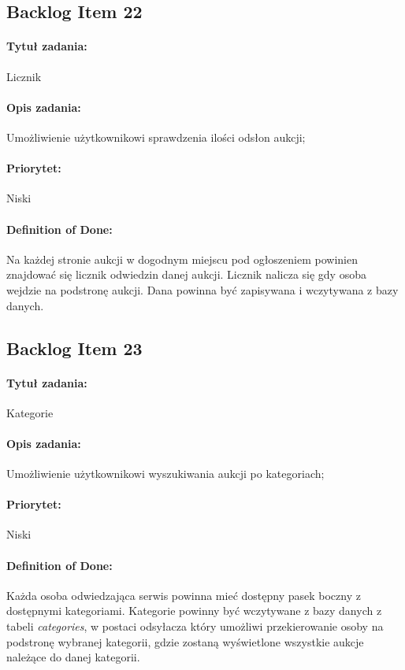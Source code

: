\documentclass[a4paper]{article}
\begin{document}
	\subsection{Backlog Item 22}
	\paragraph{Tytuł zadania:} Licznik
	\paragraph{Opis zadania:} Umożliwienie użytkownikowi sprawdzenia ilości odsłon aukcji;
	\paragraph{Priorytet:} Niski
	\paragraph{Definition of Done:} Na każdej stronie aukcji w dogodnym miejscu pod ogłoszeniem powinien znajdować się licznik odwiedzin danej aukcji. Licznik nalicza się gdy osoba wejdzie na podstronę aukcji. Dana powinna być zapisywana i wczytywana z bazy danych.
	
	\subsection{Backlog Item 23}
	\paragraph{Tytuł zadania:} Kategorie
	\paragraph{Opis zadania:} Umożliwienie użytkownikowi wyszukiwania aukcji po kategoriach;
	\paragraph{Priorytet:} Niski
	\paragraph{Definition of Done:} Każda osoba odwiedzająca serwis powinna mieć dostępny pasek boczny z dostępnymi kategoriami. Kategorie powinny być wczytywane z bazy danych z tabeli \emph{categories}, w postaci odsyłacza który umożliwi przekierowanie osoby na podstronę wybranej kategorii, gdzie zostaną wyświetlone wszystkie aukcje należące do danej kategorii. 
	
\end{document}
